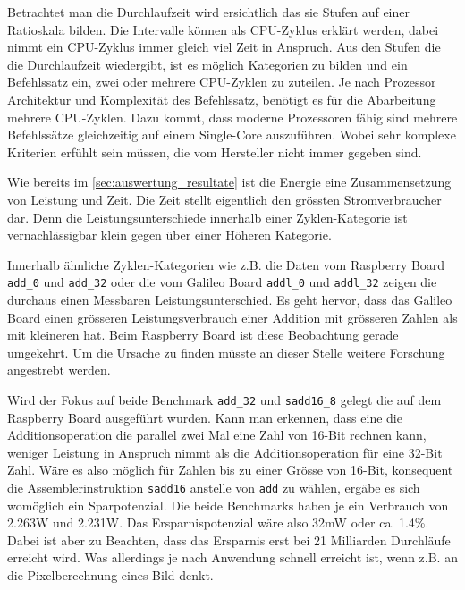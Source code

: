 Betrachtet man die Durchlaufzeit wird ersichtlich das sie Stufen auf einer Ratioskala bilden. Die Intervalle können als CPU-Zyklus erklärt werden, dabei nimmt ein CPU-Zyklus immer gleich viel Zeit in Anspruch. Aus den Stufen die die Durchlaufzeit wiedergibt, ist es möglich Kategorien zu bilden und ein Befehlssatz ein, zwei oder mehrere CPU-Zyklen zu zuteilen. Je nach Prozessor Architektur und Komplexität des Befehlssatz, benötigt es für die Abarbeitung mehrere CPU-Zyklen. Dazu kommt, dass moderne Prozessoren fähig sind mehrere Befehlssätze gleichzeitig auf einem Single-Core auszuführen. Wobei sehr komplexe Kriterien erfühlt sein müssen, die vom Hersteller nicht immer gegeben sind.
\par
Wie bereits im \autoref{sec:auswertung_resultate} ist die Energie eine Zusammensetzung von Leistung und Zeit. Die Zeit stellt eigentlich den grössten Stromverbraucher dar. Denn die Leistungsunterschiede innerhalb einer Zyklen-Kategorie ist vernachlässigbar klein gegen über einer Höheren Kategorie.
\par
Innerhalb ähnliche Zyklen-Kategorien wie z.B. die Daten vom Raspberry Board \texttt{add\_0} und \texttt{add\_32} oder die vom Galileo Board \texttt{addl\_0} und \texttt{addl\_32} zeigen die durchaus einen Messbaren Leistungsunterschied. Es geht hervor, dass das Galileo Board einen grösseren Leistungsverbrauch einer Addition mit grösseren Zahlen als mit kleineren hat. Beim Raspberry Board ist diese Beobachtung gerade umgekehrt. Um die Ursache zu finden müsste an dieser Stelle weitere Forschung angestrebt werden.
\par
Wird der Fokus auf beide Benchmark \texttt{add\_32} und \texttt{sadd16\_8} gelegt die auf dem Raspberry Board ausgeführt wurden. Kann man erkennen,  dass eine die Additionsoperation die parallel zwei Mal eine Zahl von 16-Bit rechnen kann, weniger Leistung in Anspruch nimmt als die Additionsoperation für eine 32-Bit Zahl. Wäre es also möglich für Zahlen bis zu einer Grösse von 16-Bit, konsequent die Assemblerinstruktion \texttt{sadd16} anstelle von \texttt{add} zu wählen, ergäbe es sich womöglich ein Sparpotenzial. Die beide Benchmarks haben je ein Verbrauch von 2.263W und 2.231W. Das Ersparnispotenzial wäre also 32mW oder ca. 1.4\%. Dabei ist aber zu Beachten, dass das Ersparnis erst bei 21 Milliarden Durchläufe erreicht wird. Was allerdings je nach Anwendung schnell erreicht ist, wenn z.B. an die Pixelberechnung eines Bild denkt.
\par















